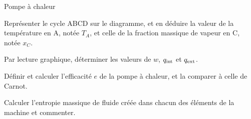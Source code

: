 \begin{exo}[PC]{Pompe à chaleur}
\begin{quest}
\item Représenter le cycle ABCD sur le diagramme, et en déduire la valeur de la température en A, notée $T_A$, et celle de la fraction massique de vapeur en C, notée $x_C$.
\item Par lecture graphique, déterminer les valeurs de $w$, $q_{\rm{int}}$ et $q_{\rm{ext}}$. \item Définir et calculer l'efficacité $e$ de la pompe à chaleur, et la comparer à celle de Carnot.
\item Calculer l'entropie massique de fluide créée dans chacun des éléments de la machine et commenter.
\end{quest}
\end{exo}


